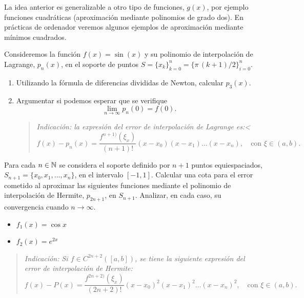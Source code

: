 La idea anterior es generalizable a otro tipo de funciones, $g(x)$,
por ejemplo funciones cuadráticas (aproximación mediante polinomios de
grado dos).  En prácticas de ordenador veremos algunos ejemplos de
aproximación mediante mínimos cuadrados.

\begin{EjerciciosPropuestos}
  \begin{problema}
    Consideremos la función $f(x)=\sin(x)$ y su polinomio de
    interpolación de Lagrange, $p_n(x)$, en el soporte de puntos
    $S=\{x_k\}_{k=0}^n= \{\pi\,(k+1)/2\}_{i=0}^n$.
    \begin{enumerate}
    \item Utilizando la fórmula de diferencias divididas de Newton,
      calcular $p_3(x)$.
    \item Argumentar si podemos esperar que se verifique
      $$
      \lim_{n\to\infty} p_n(0) = f(0).
      $$
      \begin{quote}\em\small
      Indicación: la expresión del error de interpolación de Lagrange es:<
      \begin{equation*}
        f(x)-p_n(x)=\frac{f^{n+1)}(\xi_x)}{(n+1)!}
        (x-x_0)(x-x_1)\dots(x-x_n), \quad\text{con } \xi\in (a,b).
      \end{equation*}
    \end{quote}
  \end{enumerate}
\end{problema}

\begin{problema}
    Para cada $n\in\operatorname{{\mathbb N}}$ se considera el soporte definido por $n+1$
    puntos equiespaciados, $S_{n+1}=\{x_0,x_1,...,x_n\}$, en el intervalo
    $[-1,1]$.  Calcular una cota para el error cometido al aproximar
    las siguientes funciones mediante el polinomio de interpolación
    de Hermite, $p_{2n+1}$, en $S_{n+1}$. Analizar, en cada caso, su
    convergencia cuando $n\to\infty$.
    \begin{itemize}
    \item $\displaystyle f_1(x)=\cos x$
    \item $\displaystyle f_2(x)=e^{2x}$
    \end{itemize}
    \begin{quote}\em\small
      Indicación: Si $f\in C^{2n+2}([a,b])$, se tiene la siguiente
      expresión del error de interpolación de Hermite:
      \begin{equation*}
        f(x)-P(x)=\frac{f^{2n+2)}(\xi_x)}{(2n+2)!}
        (x-x_0)^2(x-x_1)^2\dots(x-x_n)^2, \quad\text{con } \xi\in (a,b).
      \end{equation*}
    \end{quote}
  \end{problema}


\end{EjerciciosPropuestos}
